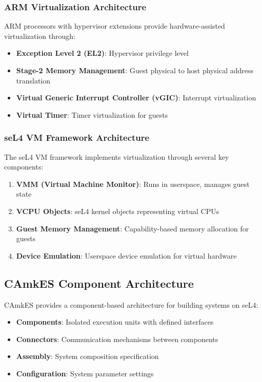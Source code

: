 \documentclass[11pt,a4paper]{article}
\begin{document}
\subsubsection{ARM Virtualization Architecture}

ARM processors with hypervisor extensions provide hardware-assisted virtualization through:

\begin{itemize}
\item \textbf{Exception Level 2 (EL2)}: Hypervisor privilege level
\item \textbf{Stage-2 Memory Management}: Guest physical to host physical address translation
\item \textbf{Virtual Generic Interrupt Controller (vGIC)}: Interrupt virtualization
\item \textbf{Virtual Timer}: Timer virtualization for guests
\end{itemize}

\subsubsection{seL4 VM Framework Architecture}

The seL4 VM framework implements virtualization through several key components:

\begin{enumerate}
\item \textbf{VMM (Virtual Machine Monitor)}: Runs in userspace, manages guest state
\item \textbf{VCPU Objects}: seL4 kernel objects representing virtual CPUs
\item \textbf{Guest Memory Management}: Capability-based memory allocation for guests
\item \textbf{Device Emulation}: Userspace device emulation for virtual hardware
\end{enumerate}

\subsection{CAmkES Component Architecture}

CAmkES provides a component-based architecture for building systems on seL4:

\begin{itemize}
\item \textbf{Components}: Isolated execution units with defined interfaces
\item \textbf{Connectors}: Communication mechanisms between components
\item \textbf{Assembly}: System composition specification
\item \textbf{Configuration}: System parameter settings
\end{itemize}
\end{document}
